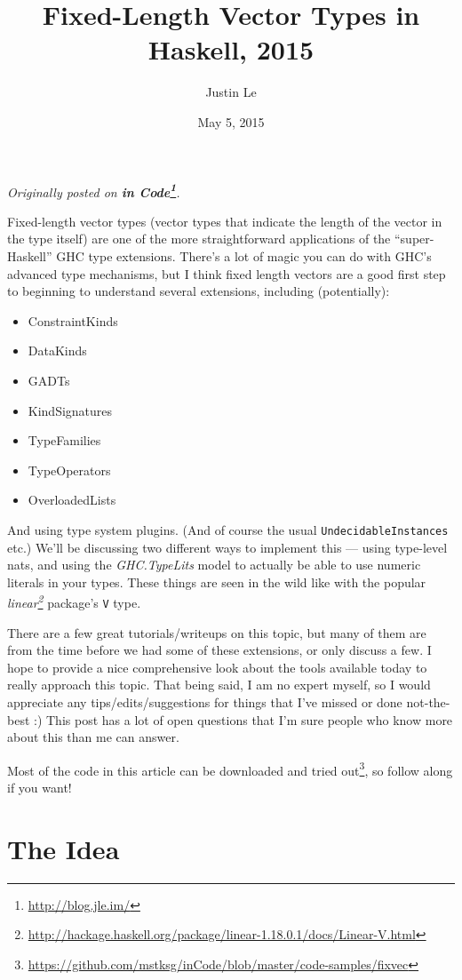 \documentclass[]{article}
\title{Fixed-Length Vector Types in Haskell, 2015}
\author{Justin Le}
\date{May 5, 2015}
\renewcommand{\href}[2]{#2\footnote{\url{#1}}}
\begin{document}
\maketitle

\emph{Originally posted on \textbf{\href{http://blog.jle.im/}{in
Code}}.}

Fixed-length vector types (vector types that indicate the length of the
vector in the type itself) are one of the more straightforward
applications of the ``super-Haskell'' GHC type extensions. There's a lot
of magic you can do with GHC's advanced type mechanisms, but I think
fixed length vectors are a good first step to beginning to understand
several extensions, including (potentially):

\begin{itemize}
\tightlist
\item
  ConstraintKinds
\item
  DataKinds
\item
  GADTs
\item
  KindSignatures
\item
  TypeFamilies
\item
  TypeOperators
\item
  OverloadedLists
\end{itemize}

And using type system plugins. (And of course the usual
\texttt{UndecidableInstances} etc.) We'll be discussing two different
ways to implement this --- using type-level nats, and using the
\emph{GHC.TypeLits} model to actually be able to use numeric literals in
your types. These things are seen in the wild like with the popular
\emph{\href{http://hackage.haskell.org/package/linear-1.18.0.1/docs/Linear-V.html}{linear}}
package's \texttt{V} type.

There are a few great tutorials/writeups on this topic, but many of them
are from the time before we had some of these extensions, or only
discuss a few. I hope to provide a nice comprehensive look about the
tools available today to really approach this topic. That being said, I
am no expert myself, so I would appreciate any tips/edits/suggestions
for things that I've missed or done not-the-best :) This post has a lot
of open questions that I'm sure people who know more about this than me
can answer.

Most of the code in this article can be
\href{https://github.com/mstksg/inCode/blob/master/code-samples/fixvec}{downloaded
and tried out}, so follow along if you want!

\section{The Idea}\label{the-idea}
\end{document}
